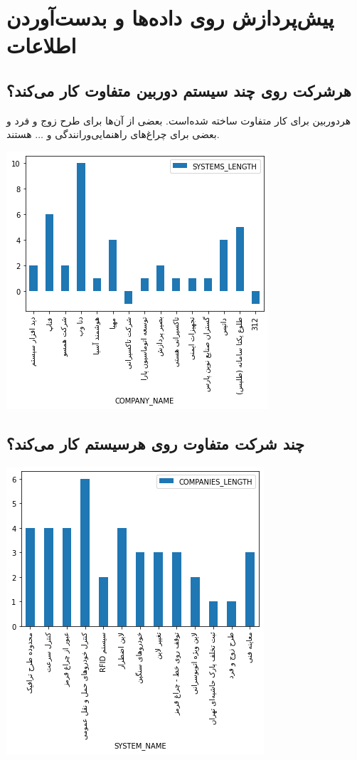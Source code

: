 \documentclass[12pt]{article}
\begin{document}
\section*{پیش‌پردازش روی داده‌ها و بدست‌آوردن اطلاعات}
\subsection*{هرشرکت روی چند سیستم دوربین متفاوت کار می‌کند؟}
هر‌دوربین برای کار متفاوت ساخته شده‌است. بعضی از آن‌ها برای طرح زوج و فرد و بعضی برای چراغ‌های راهنمایی‌و‌رانندگی و 
$\dots$
هستند.


\includegraphics[scale=1]{companyLength.png}

\subsection*{چند شرکت متفاوت روی هر‌سیستم کار می‌کند؟}

\includegraphics[scale=1]{systemLength.png}
\end{document}
